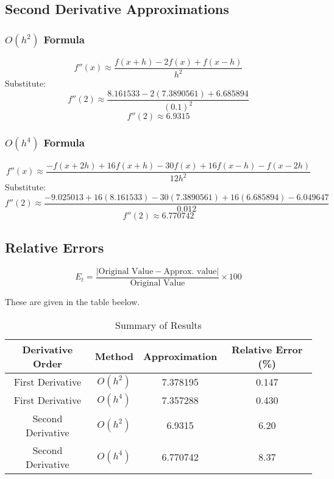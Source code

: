 \documentclass[11pt]{article}
\begin{document}
\subsection*{Second Derivative Approximations}
\subsubsection*{\( O(h^2) \) Formula}
\[
f''(x) \approx \frac{f(x+h) - 2f(x) + f(x-h)}{h^2}
\]
Substitute:
\[
f''(2) \approx \frac{8.161533 - 2(7.3890561) + 6.685894}{(0.1)^2}
\]
\[
f''(2) \approx 6.9315
\]

\subsubsection*{\( O(h^4) \) Formula}
\[
f''(x) \approx \frac{-f(x+2h) + 16f(x+h) - 30f(x) + 16f(x-h) - f(x-2h)}{12h^2}
\]
Substitute:
\[
f''(2) \approx \frac{-9.025013 + 16(8.161533) - 30(7.3890561) + 16(6.685894) - 6.049647}{0.012}
\]
\[
f''(2) \approx 6.770742
\]

\subsection*{Relative Errors}
\[
E_t = \frac{| \text{Original Value} - \text{Approx. value} |}{\text{Original Value}} \times 100
\]

These are given in the table beelow. 

\begin{table}[h!]
\centering
\begin{tabular}{|c|c|c|c|}
\hline
Derivative Order & Method   & Approximation & Relative Error (\%) \\
\hline
First Derivative  & \( O(h^2) \) & 7.378195     & 0.147                   \\
First Derivative  & \( O(h^4) \) & 7.357288     & 0.430                   \\
Second Derivative & \( O(h^2) \) & 6.9315       & 6.20                    \\
Second Derivative & \( O(h^4) \) & 6.770742     & 8.37                    \\
\hline
\end{tabular}
\caption{Summary of Results}
\end{table}
\end{document}
